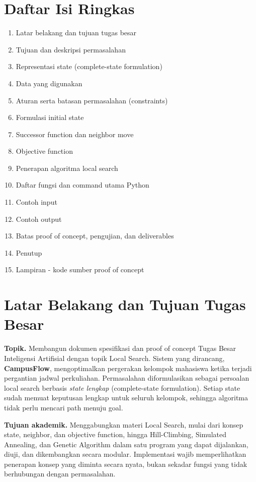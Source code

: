 \documentclass[11pt,a4paper]{article}
\begin{document}
\section*{\Large\bfseries Daftar Isi Ringkas}
\begin{enumerate}[leftmargin=2em,itemsep=0.2em]
  \item Latar belakang dan tujuan tugas besar
  \item Tujuan dan deskripsi permasalahan
  \item Representasi state (complete-state formulation)
  \item Data yang digunakan
  \item Aturan serta batasan permasalahan (constraints)
  \item Formulasi initial state
  \item Successor function dan neighbor move
  \item Objective function
  \item Penerapan algoritma local search
  \item Daftar fungsi dan command utama Python
  \item Contoh input
  \item Contoh output
  \item Batas proof of concept, pengujian, dan deliverables
  \item Penutup
  \item Lampiran - kode sumber proof of concept
\end{enumerate}

\newpage

\section{Latar Belakang dan Tujuan Tugas Besar}

\textbf{Topik.} Membangun dokumen spesifikasi dan proof of concept Tugas Besar Inteligensi Artifisial dengan topik Local Search. Sistem yang dirancang, \textbf{CampusFlow}, mengoptimalkan pergerakan kelompok mahasiswa ketika terjadi pergantian jadwal perkuliahan. Permasalahan diformulasikan sebagai persoalan local search berbasis \emph{state lengkap} (complete-state formulation). Setiap state sudah memuat keputusan lengkap untuk seluruh kelompok, sehingga algoritma tidak perlu mencari path menuju goal.

\textbf{Tujuan akademik.} Menggabungkan materi Local Search, mulai dari konsep state, neighbor, dan objective function, hingga Hill-Climbing, Simulated Annealing, dan Genetic Algorithm dalam satu program yang dapat dijalankan, diuji, dan dikembangkan secara modular. Implementasi wajib memperlihatkan penerapan konsep yang diminta secara nyata, bukan sekadar fungsi yang tidak berhubungan dengan permasalahan.
\end{document}
